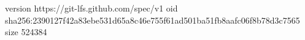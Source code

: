 version https://git-lfs.github.com/spec/v1
oid sha256:2390127f42a83ebe531d65a8c46e755f61ad501ba51fb8aafc06f8b78d3c7565
size 524384
